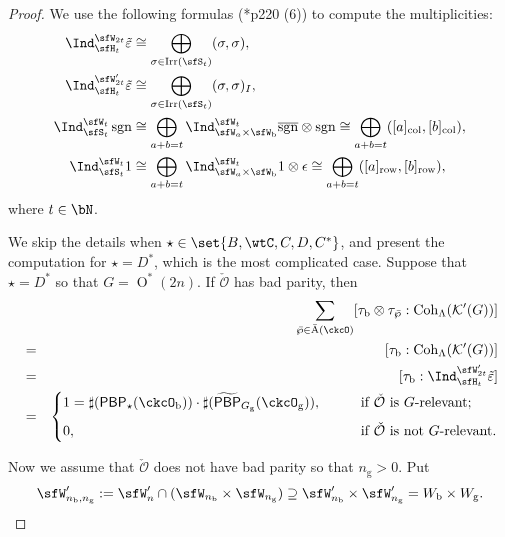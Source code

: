 \documentclass[12pt]{amsart}
\newcommand{\CK}{{\mathcal {K}}}
\newcommand{\CO}{{\mathcal {O}}}
\newcommand{\sgn}{\operatorname{sgn}}
\newcommand{\oO}{\operatorname{O}}
\numberwithin{equation}{section}
\theoremstyle{remark}
\def\Irr{\mathrm{Irr}}
\def\bsgn{\overline{\sgn}}
\def\nbb{n_{\mathrm b}}
\def\ngg{n_{\mathrm g}}
\def\Coh{\mathrm{Coh}}
\def\tPBP{\widetilde{\mathsf{PBP}}}
\def\PBP{\mathsf{PBP}}
\def\tPBP{\widetilde{\mathsf{PBP}}}
\begin{document}
 \begin{proof}
   We use the following
  formulas (\cite{Mc}*{p220 (6)})  to compute the multiplicities:
  \begin{equation}\label{eq:indSW}
    \begin{split}
      \Ind_{\sfH_{t}}^{\sfW_{2t}} \tilde{\varepsilon}& \cong   \bigoplus_{\sigma\in \Irr(\sfS_{t})} (\sigma,\sigma),\\
      \Ind_{\sfH_{t}}^{\sfW'_{2t}} \tilde{\varepsilon} &\cong  \bigoplus_{\sigma\in \Irr(\sfS_{t})} (\sigma,\sigma)_{I},\\
      \Ind_{\sfS_{t}}^{\sfW_{t}}\sgn &\cong \bigoplus_{a+b=t}\Ind_{\sfW_{a}\times \sfW_{\mathrm b}}^{\sfW_{t}} \bsgn\otimes \sgn \cong \bigoplus_{a+b=t} ([a]_{\mathrm{col}},[b]_{\mathrm{col}}),\\
      \Ind_{\sfS_{t}}^{\sfW_{t}} 1 &\cong \bigoplus_{a+b=t}\Ind_{\sfW_{a}\times \sfW_{\mathrm b}}^{\sfW_{t}} 1 \otimes \epsilon \cong \bigoplus_{a+b=t} ([a]_{\mathrm{row}},[b]_{\mathrm{row}}),
    \end{split}
\end{equation}
where $t\in \bN$.

We skip the details when $\star \in \set{B,\wtC, C,D,C^{*}}$, and present the computation for $\star = D^{*}$, which is the most complicated case.
 Suppose that $\star=D^*$ so that $G=\oO^*(2n)$.  If $\check \CO$ has bad parity, then
  \begin{eqnarray*}
 && \sum_{\bar \wp\in \bar{\mathrm A}(\ckcO)} [\tau_{\mathrm b}\otimes \tau_{\bar \wp}: \Coh_{\Lambda} (\CK'(G))] \medskip \\
 &=&[\tau_{\mathrm b} : \Coh_{\Lambda} (\CK'(G))] \medskip \\
 &=& [\tau_\mathrm b:\Ind_{\sfH_{t}}^{\sfW'_{2t}} \tilde{\varepsilon}] \medskip \\
& =& \begin{cases}
    1=\sharp (\PBP_{\star}(\ckcO_{\mathrm b}))\cdot \sharp(\tPBP_{G_{\mathrm g}}(\ckcO_{\mathrm g})),  \qquad &  \text{if $\check \CO$ is $G$-relevant;}\medskip \\
          0, \qquad & \text{if $\check \CO$ is not $G$-relevant.}
       \end{cases}
  \end{eqnarray*}


Now we assume that $\check \CO$ does not have bad parity so that $n_\mathrm g>0$.
 Put
 \[
   \sfW'_{\nbb, \ngg}:=\sfW'_n\cap (\sfW_{\nbb}\times \sfW_{\ngg})\supseteq \sfW'_{\nbb}\times \sfW'_{\ngg}= W_{\mathrm b}\times W_{\mathrm g}.
 \]



\end{proof}
\end{document}
